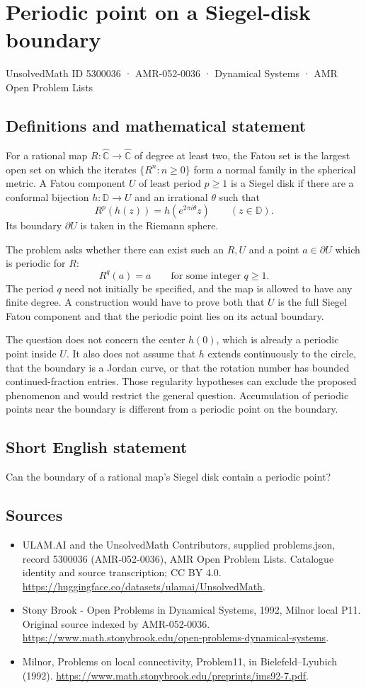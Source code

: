 \documentclass[11pt,a4paper]{article}
\begin{document}
\section*{Periodic point on a Siegel-disk boundary}\label{5300036}
{\small UnsolvedMath ID 5300036 · AMR-052-0036 · Dynamical Systems · AMR Open Problem Lists}
\subsection{Definitions and mathematical statement}
For a rational map $R:\widehat{\mathbb C}\to\widehat{\mathbb C}$ of
degree at least two, the Fatou set is the largest open set on which
the iterates $\{R^n:n\ge0\}$ form a normal family in the spherical
metric. A Fatou component $U$ of least period $p\ge1$ is a Siegel
disk if there are a conformal bijection $h:\mathbb D\to U$ and an
irrational $\theta$ such that
\[
 R^p(h(z))=h(e^{2\pi i\theta}z)\qquad(z\in\mathbb D).
\]
Its boundary $\partial U$ is taken in the Riemann sphere.

The problem asks whether there can exist such an $R,U$ and a point
$a\in\partial U$ which is periodic for $R$:
\[
 R^q(a)=a\qquad\text{for some integer }q\ge1.
\]
The period $q$ need not initially be specified, and the map is allowed
to have any finite degree. A construction would have to prove both
that $U$ is the full Siegel Fatou component and that the periodic
point lies on its actual boundary.

The question does not concern the center $h(0)$, which is already a
periodic point inside $U$. It also does not assume that $h$ extends
continuously to the circle, that the boundary is a Jordan curve, or
that the rotation number has bounded continued-fraction entries.
Those regularity hypotheses can exclude the proposed phenomenon and
would restrict the general question. Accumulation of periodic points
near the boundary is different from a periodic point on the boundary.
\subsection{Short English statement}
Can the boundary of a rational map’s Siegel disk contain a periodic point?
\subsection{Sources}
\begin{itemize}
\item[S1] ULAM.AI and the UnsolvedMath Contributors, supplied problems.json, record 5300036 (AMR-052-0036), AMR Open Problem Lists. Catalogue identity and source transcription; CC BY 4.0.
\url{https://huggingface.co/datasets/ulamai/UnsolvedMath}.
\item[S2] Stony Brook - Open Problems in Dynamical Systems, 1992, Milnor local P11. Original source indexed by AMR-052-0036.
\url{https://www.math.stonybrook.edu/open-problems-dynamical-systems}.
\item[S3] Milnor, Problems on local connectivity, Problem11, in Bielefeld–Lyubich (1992).
\url{https://www.math.stonybrook.edu/preprints/ims92-7.pdf}.
\end{itemize}
\end{document}
